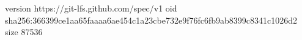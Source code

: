 version https://git-lfs.github.com/spec/v1
oid sha256:366399ce1aa65faaaa6ae454c1a23cbe732e9f76fc6fb9ab8399c8341c1026d2
size 87536
